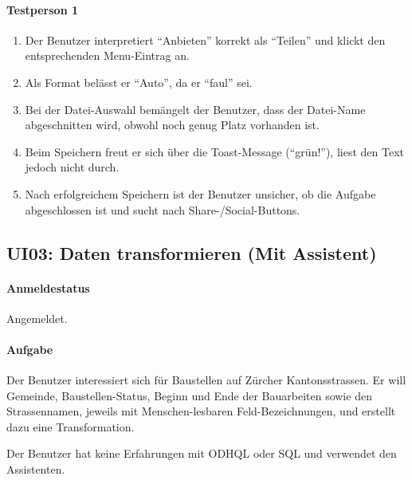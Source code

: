 \paragraph{Testperson 1}
\begin{enumerate}
\item Der Benutzer interpretiert ``Anbieten'' korrekt als ``Teilen'' und klickt den entsprechenden Menu-Eintrag an.
\item Als Format belässt er ``Auto'', da er ``faul'' sei.
\item Bei der Datei-Auswahl bemängelt der Benutzer, dass der Datei-Name abgeschnitten wird, obwohl noch genug Platz vorhanden ist.
\item Beim Speichern freut er sich über die Toast-Message (``grün!''), liest den Text jedoch nicht durch.
\item Nach erfolgreichem Speichern ist der Benutzer unsicher, ob die Aufgabe abgeschlossen ist und sucht nach Share-/Social-Buttons.
\end{enumerate}

\subsection{UI03: Daten transformieren (Mit Assistent)}\label{ui-test-trf-ass}
\paragraph{Anmeldestatus} Angemeldet.
\paragraph{Aufgabe} Der Benutzer interessiert sich für Baustellen auf Zürcher Kantonsstrassen. Er will Gemeinde, Baustellen-Status, Beginn und Ende der Bauarbeiten sowie den Strassennamen, jeweils mit Menschen-lesbaren Feld-Bezeichnungen, und erstellt dazu eine Transformation.

Der Benutzer hat keine Erfahrungen mit ODHQL oder SQL und verwendet den Assistenten.

